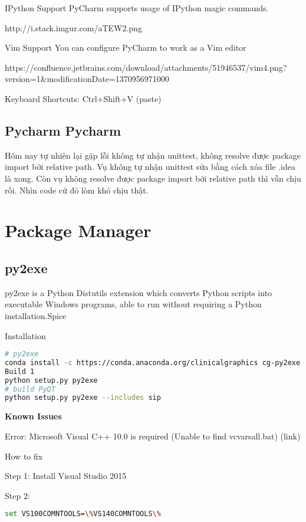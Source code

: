 IPython Support
PyCharm supports usage of IPython magic commands.

http://i.stack.imgur.com/aTEW2.png

Vim Support
You can configure PyCharm to work as a Vim editor

https://confluence.jetbrains.com/download/attachments/51946537/vim4.png?version=1&modificationDate=1370956971000

Keyboard Shortcuts: Ctrl+Shift+V (paste)

\subsection{Pycharm Pycharm}


Hôm nay tự nhiên lại gặp lỗi không tự nhận unittest, không resolve được package import bởi relative path. Vụ không tự nhận unittest sửa bằng cách xóa file .idea là xong. Còn vụ không resolve được package import bởi relative path thì vẫn chịu rồi. Nhìn code cứ đỏ lòm khó chịu thật.

\section{Package Manager}

\subsection{py2exe}

py2exe is a Python Distutils extension which converts Python scripts into executable Windows programs, able to run without requiring a Python installation.Spice

Installation
\begin{lstlisting}[language=bash]
# py2exe
conda install -c https://conda.anaconda.org/clinicalgraphics cg-py2exe
Build 1
python setup.py py2exe
# build PyQT
python setup.py py2exe --includes sip
\end{lstlisting}

\textbf{Known Issues}

Error: Microsoft Visual C++ 10.0 is required (Unable to find vcvarsall.bat) (link)

How to fix


Step 1: Install Visual Studio 2015

Step 2:

\begin{lstlisting}[language=bash]
set VS100COMNTOOLS=\%VS140COMNTOOLS\%
\end{lstlisting}

